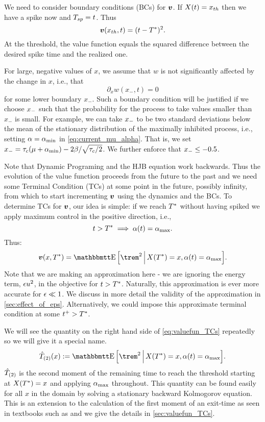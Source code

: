 We need to consider boundary conditions (BCs) for ${ \boldsymbol{v} }$. If $X(t) = { x_{th} }$ then we
have a spike now and $T_{sp} = t$. Thus $$ { \boldsymbol{v} }({ x_{th} },t) = (t-{ T^* })^2.$$ At the
threshold, the value function equals the squared difference between the desired
spike time and the realized one. 

For large, negative values of $x$, we assume that $w$ is not 
significantly affected by the change in $x$, i.e., that $$ \partial_x
w(x_{-}, t) = 0 $$ for some lower boundary $x_{-}$. Such a boundary
condition will be justified if we choose ${ x_{-} }$ such that the probability for the
process to take values smaller than $x_{-}$ is small. For example, we can take ${ x_{-} }$ to be two
standard deviations below the mean of the stationary distribution of the
maximally inhibited process, i.e., setting $\alpha={ \alpha_{\textrm{min}} }$ in
\cref{eq:current_mu_alpha}. That is, we set ${ x_{-} } = \tau_c(\mu + { \alpha_{\textrm{min}} }) - 2 \beta
/ \sqrt{\tau_c/2}$. We further enforce that ${ x_{-} } \leq -0.5$. 

Note that Dynamic Programing and the HJB equation work backwards. Thus the
evolution of the value function proceeds from the future to the past and we need
some Terminal Condition (TCs) at some point in the future, possibly infinity,
from which to start incrementing ${ \boldsymbol{v} }$ using the dynamics and the BCs. To
determine TCs for ${ \boldsymbol{v} }$, our idea is simple: if we reach ${ T^* }$ without having
spiked we apply maximum control in the positive direction, i.e., 
$$t>{ T^* } \implies \alpha(t) = { \alpha_{\textrm{max}} }.$$ Thus: \begin{equation}\v(x,\T) = \Exp
\Big[\trem^2 \,\Big|\, X(\T) = x, \a(t) = \amax \Big].
\label{eq:valuefun_TCs}
\end{equation}
Note that we are making an approximation here
- we are ignoring the energy term, ${\epsilon} u^2$, in the objective for
$t>{ T^* }$. Naturally, this approximation is ever more accurate for ${\epsilon} \ll 1$.
We discuss in more detail the validity of the approximation in
\cref{sec:effect_of_eps}.
Alternatively, we could impose this approximate terminal condition at some $t^+
> { T^* }$.

We will see the quantity on the right hand side of \cref{eq:valuefun_TCs}
repeatedly so we will give it a special name.
\begin{equation}
\Ttwo(x) := \Exp \Big[\trem^2 \,\Big|\, X(\T) = x, \a(t) = \amax \Big].
\label{eq:Trem_squared}
\end{equation}
${ \hat{T}_{(2)} }$ is the second moment of the remaining time to reach the
threshold starting at $X({ T^* }) = x$ and applying ${ \alpha_{\textrm{max}} }$ throughout. This quantity
can be found easily for all $x$ in the domain by solving a stationary backward Kolmogorov
equation. This is an extension to the calculation of the first moment of an
exit-time as seen in textbooks such as \cite{Jacobs} and we give the
details in \cref{sec:valuefun_TCs}.

